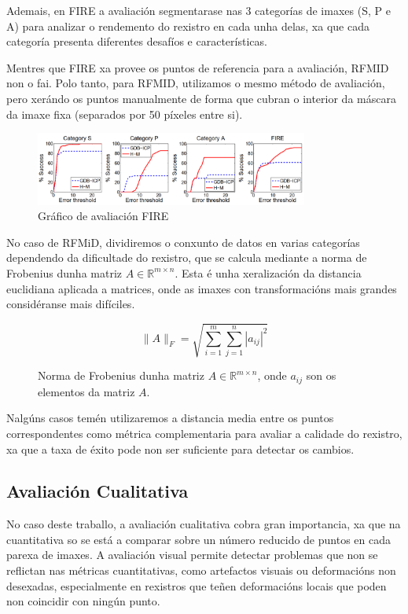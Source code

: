 Ademais, en FIRE a avaliación segmentarase nas 3 categorías de imaxes (S, P e A) para analizar o rendemento do rexistro en cada unha delas, xa que cada categoría presenta diferentes desafíos e características.

 Mentres que FIRE xa provee os puntos de referencia para a avaliación, RFMID non o fai.
 Polo tanto, para RFMID, utilizamos o mesmo método de avaliación, pero xerándo os puntos manualmente de forma que cubran o interior da máscara da imaxe fixa (separados por 50 píxeles entre si).
 
 \begin{figure}[tbp]
    \centering
    \includegraphics[width=0.8\textwidth]{imaxes/fire_aval.png}
    \caption{Gráfico de avaliación FIRE \cite{FIRE}}
    \label{fig:fire_aval}
\end{figure}

No caso de RFMiD, dividiremos o conxunto de datos en varias categorías dependendo da dificultade do rexistro, que se calcula mediante a norma de Frobenius dunha matriz $A \in \mathbb{R}^{m \times n}$.
Esta é unha xeralización da distancia euclidiana aplicada a matrices, onde as imaxes con transformacións mais grandes considéranse mais difíciles.

\begin{figure}[tbp]
    \centering
    \[
    \|A\|_F = \sqrt{\sum_{i=1}^{m} \sum_{j=1}^{n} |a_{ij}|^2}
    \]
    \caption{Norma de Frobenius dunha matriz $A \in \mathbb{R}^{m \times n}$, onde $a_{ij}$ son os elementos da matriz $A$.}
    \label{fig:frobenius_norm}
\end{figure}

Nalgúns casos temén utilizaremos a distancia media entre os puntos correspondentes como métrica complementaria para avaliar a calidade do rexistro, xa que a taxa de éxito pode non ser suficiente para detectar os cambios.

\subsection{Avaliación Cualitativa}
\label{subsec:Avaliación Cualitativa}

No caso deste traballo, a avaliación cualitativa cobra gran importancia, xa que na cuantitativa so se está a comparar sobre un número reducido de puntos en cada parexa de imaxes.
A avaliación visual permite detectar problemas que non se reflictan nas métricas cuantitativas, como artefactos visuais ou deformacións non desexadas, 
especialmente en rexistros que teñen deformacións locais que poden non coincidir con ningún punto.

